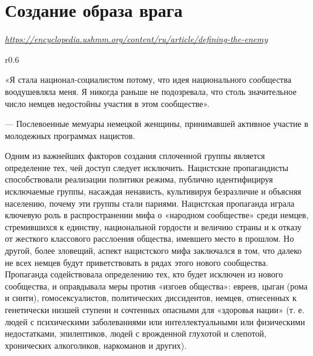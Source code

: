 \newpage
\section{Создание образа врага}

\textit{\url{https://encyclopedia.ushmm.org/content/ru/article/defining-the-enemy}}

\begin{wrapfigure}{r}{0.6\textwidth}
    \begin{fancyquotes}
        «Я стала национал-социалистом потому, что идея национального сообщества воодушевляла меня. Я никогда раньше не подозревала, что столь значительное число немцев недостойны участия в этом сообществе».\\[1em]

        \begin{flushright}
            --- Послевоенные мемуары немецкой женщины, принимавшей активное участие в молодежных программах нацистов.
        \end{flushright}
    \end{fancyquotes}
\end{wrapfigure}
Одним из важнейших факторов создания сплоченной группы является определение тех, чей доступ следует исключить. Нацистские пропагандисты способствовали реализации политики режима, публично идентифицируя исключаемые группы, насаждая ненависть, культивируя безразличие и объясняя населению, почему эти группы стали париями. Нацистская пропаганда играла ключевую роль в распространении мифа о «народном сообществе» среди немцев, стремившихся к единству, национальной гордости и величию страны и к отказу от жесткого классового расслоения общества, имевшего место в прошлом. Но другой, более зловещий, аспект нацистского мифа заключался в том, что далеко не всех немцев будут приветствовать в рядах этого нового сообщества. Пропаганда содействовала определению тех, кто будет исключен из нового сообщества, и оправдывала меры против «изгоев общества»: евреев, цыган (рома и синти), гомосексуалистов, политических диссидентов, немцев, отнесенных к генетически низшей ступени и сочтенных опасными для «здоровья нации» (т. е. людей с психическими заболеваниями или интеллектуальными или физическими недостатками, эпилептиков, людей с врожденной глухотой и слепотой, хронических алкоголиков, наркоманов и других).

